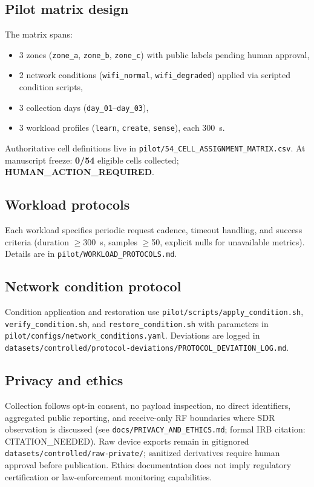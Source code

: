 \subsection{Pilot matrix design}
The matrix spans:
\begin{itemize}
  \item 3 zones (\texttt{zone\_a}, \texttt{zone\_b}, \texttt{zone\_c}) with public labels pending human approval,
  \item 2 network conditions (\texttt{wifi\_normal}, \texttt{wifi\_degraded}) applied via scripted condition scripts,
  \item 3 collection days (\texttt{day\_01}--\texttt{day\_03}),
  \item 3 workload profiles (\texttt{learn}, \texttt{create}, \texttt{sense}), each 300~s.
\end{itemize}
Authoritative cell definitions live in \texttt{pilot/54\_CELL\_ASSIGNMENT\_MATRIX.csv}.
At manuscript freeze: \textbf{0/54} eligible cells collected; \textbf{HUMAN\_ACTION\_REQUIRED}.

\subsection{Workload protocols}
Each workload specifies periodic request cadence, timeout handling, and success criteria (duration $\geq$300~s, samples $\geq$50, explicit nulls for unavailable metrics).
Details are in \texttt{pilot/WORKLOAD\_PROTOCOLS.md}.

\subsection{Network condition protocol}
Condition application and restoration use \texttt{pilot/scripts/apply\_condition.sh}, \texttt{verify\_condition.sh}, and \texttt{restore\_condition.sh} with parameters in \texttt{pilot/configs/network\_conditions.yaml}.
Deviations are logged in \texttt{datasets/controlled/protocol-deviations/PROTOCOL\_DEVIATION\_LOG.md}.

\subsection{Privacy and ethics}
Collection follows opt-in consent, no payload inspection, no direct identifiers, aggregated public reporting, and receive-only RF boundaries where SDR observation is discussed (see \texttt{docs/PRIVACY\_AND\_ETHICS.md}; formal IRB citation: CITATION\_NEEDED).
Raw device exports remain in gitignored \texttt{datasets/controlled/raw-private/}; sanitized derivatives require human approval before publication.
Ethics documentation does not imply regulatory certification or law-enforcement monitoring capabilities.
